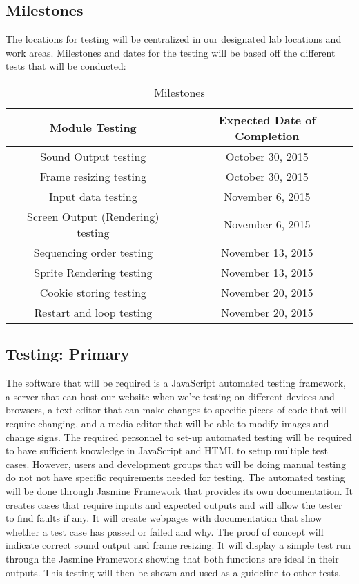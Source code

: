 \documentclass[11pt, oneside]{article}   	%
\begin{document}
\subsection{Milestones}
The locations for testing will be centralized in our designated lab locations and work areas. 
Milestones and dates for the testing will be based off the different tests that will be conducted: 
 
 \begin{table}[H]
\caption{Milestones}
\begin{center}
\begin{tabular}{|c|c|}
\hline
\textbf{Module Testing} & \textbf{Expected Date of Completion}\\
\hline
\hline
Sound Output testing & October 30, 2015\\
\hline
Frame resizing testing & October 30, 2015\\
\hline
Input data testing & November 6, 2015\\
\hline
Screen Output (Rendering) testing & November 6, 2015\\
\hline
Sequencing order testing & November 13, 2015\\
\hline
Sprite Rendering testing & November 13, 2015\\
\hline
Cookie storing testing & November 20, 2015\\
\hline
Restart and loop testing & November 20, 2015\\
\hline
\end{tabular}
\end{center}
\label{default}
\end{table}%
 
\subsection{Testing: Primary}
The software that will be required is a JavaScript automated testing framework, a server that can host our website when we're testing on different devices and browsers, a text editor that can make changes to specific pieces of code that will require changing, and a media editor that will be able to modify images and change signs. 
The required personnel to set-up automated testing will be required to have sufficient knowledge in JavaScript and HTML to setup multiple test cases. However, users and development groups that will be doing manual testing do not not have specific requirements needed for testing. 
The automated testing will be done through Jasmine Framework that provides its own documentation. It creates cases that require inputs and expected outputs and will allow the tester to find faults if any. It will create webpages with documentation that show whether a test case has passed or failed and why. 
The proof of concept will indicate correct sound output and frame resizing. It will display a simple test run through the Jasmine Framework showing that both functions are ideal in their outputs. This testing will then be shown and used as a guideline to other tests. 
\\
\\
\\
\end{document}
